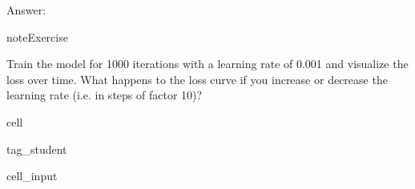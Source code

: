 \documentclass[letterpaper,10pt,english]{jupyterBook}
\begin{document}
\sphinxAtStartPar
Answer:

\begin{sphinxadmonition}{note}{Exercise}

\sphinxAtStartPar
Train the model for 1000 iterations with a learning rate of 0.001 and visualize the loss over time. What happens to the loss curve if you increase or decrease the learning rate (i.e. in steps of factor 10)?
\end{sphinxadmonition}

\begin{sphinxuseclass}{cell}
\begin{sphinxuseclass}{tag_student}\begin{sphinxVerbatimInput}

\begin{sphinxuseclass}{cell_input}
\begin{sphinxVerbatim}[commandchars=\\\{\}]
        

\end{sphinxVerbatim}

\end{sphinxuseclass}\end{sphinxVerbatimInput}

\end{sphinxuseclass}
\end{sphinxuseclass}
\end{document}
